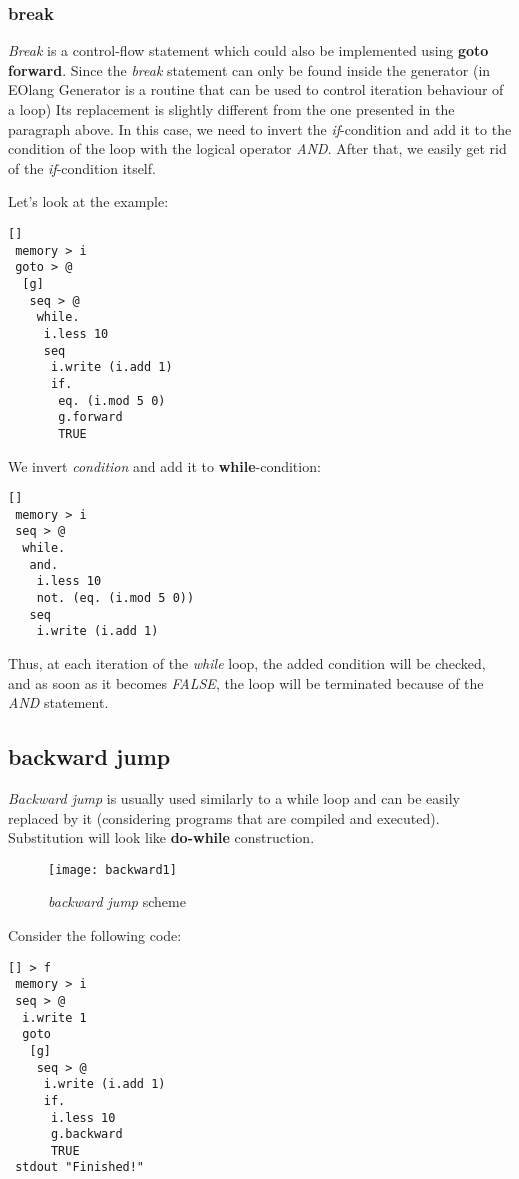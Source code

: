 \documentclass[two column]{article}
\begin{document}
\subsubsection{break}
\textit{Break} is a control-flow statement which could also be implemented using \textbf{goto forward}. Since the \textit{break} statement can only be found inside the generator (in EOlang Generator is a routine that can be used to control iteration behaviour of a loop) Its replacement is slightly different from the one presented in the paragraph above. In this case, we need to invert the \textit{if}-condition and add it to the condition of the loop with the logical operator \textit{AND}. After that, we easily get rid of the \textit{if}-condition itself.

Let's look at the example:
\begin{lstlisting}
[]
 memory > i
 goto > @
  [g]
   seq > @
    while.
     i.less 10
     seq
      i.write (i.add 1)
      if.
       eq. (i.mod 5 0)
       g.forward
       TRUE
\end{lstlisting}

We invert \textit{condition} and add it to \textbf{while}-condition:
\begin{lstlisting}
[]
 memory > i
 seq > @
  while.
   and.
    i.less 10
    not. (eq. (i.mod 5 0))
   seq
    i.write (i.add 1)
\end{lstlisting}

Thus, at each iteration of the \textit{while} loop, the added condition will be checked, and as soon as it becomes \textit{FALSE}, the loop will be terminated because of the \textit{AND} statement.

\subsection{backward jump}
\textit{Backward jump} is usually used similarly to a while loop and can be easily replaced by it (considering programs that are compiled and executed). Substitution will look like \textbf{do-while} construction.

\begin{figure}[h]
    \centering
    \texttt{[image: backward1]}
    \caption{\textit{backward jump} scheme}
    \label{fig:my_label}
\end{figure}

Consider the following code:
\begin{lstlisting}
[] > f
 memory > i
 seq > @
  i.write 1
  goto
   [g]
    seq > @
     i.write (i.add 1)
     if.
      i.less 10
      g.backward
      TRUE
 stdout "Finished!"
\end{lstlisting}
\end{document}
